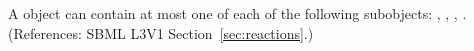 A \Reaction object can contain at most one of each of the following
subobjects: \ListOfReactants, \ListOfProducts, \ListOfModifiers,
\KineticLaw.  (References: SBML L3V1 Section~\ref{sec:reactions}.)
